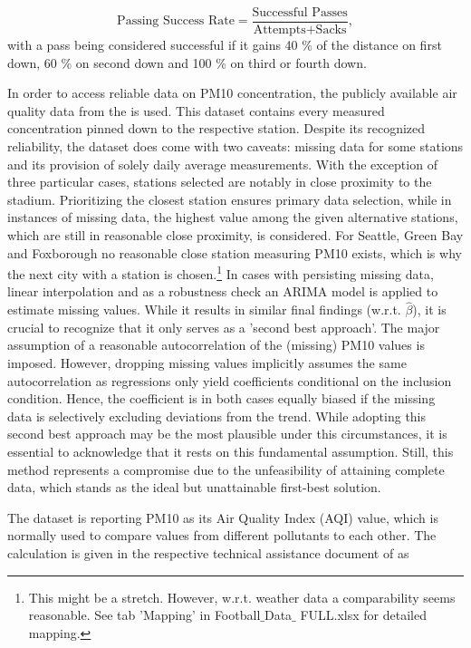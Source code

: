 \documentclass[12pt,a4paper]{article}
\begin{document}
\begin{equation}
\textrm{Passing Success Rate} = \dfrac{\textrm{Successful Passes}}{\textrm{Attempts} + \textrm{Sacks}},
\end{equation}
with a pass being considered successful if it gains 40 \% of the distance on first down, 60 \% on second down and 100 \% on third or fourth down. 

In order to access reliable data on PM10 concentration, the publicly available air quality data from the \citeauthor{EPA} is used. This dataset contains every measured concentration pinned down to the respective station. Despite its recognized reliability, the \citeauthor{EPA} dataset does come with two caveats: missing data for some stations and its provision of solely daily average measurements. With the exception of three particular cases, stations selected are notably in close proximity to the stadium. Prioritizing the closest station ensures primary data selection, while in instances of missing data, the highest value among the given alternative stations, which are still in reasonable close proximity, is considered. For Seattle, Green Bay and Foxborough no reasonable close station measuring PM10 exists, which is why the next city with a station is chosen.\footnote{This might be a stretch. However, w.r.t. weather data a comparability seems reasonable. See tab 'Mapping' in Football$\_$Data$\_$ FULL.xlsx for detailed mapping.}
In cases with persisting missing data, linear interpolation and as a robustness check an ARIMA model is applied to estimate missing values. While it results in similar final findings (w.r.t. $\hat{\beta}$), it is crucial to recognize that it only serves as a 'second best approach'. The major assumption of a reasonable autocorrelation of the (missing) PM10 values is imposed. However, dropping missing values implicitly assumes the same autocorrelation as regressions only yield coefficients conditional on the inclusion condition. Hence, the coefficient is in both cases equally biased if the missing data is selectively excluding deviations from the trend. While adopting this second best approach may be the most plausible under this circumstances, it is essential to acknowledge that it rests on this fundamental assumption. Still, this method represents a compromise due to the unfeasibility of attaining complete data, which stands as the ideal but unattainable first-best solution.

The \citeauthor{EPA} dataset is reporting PM10 as its Air Quality Index (AQI) value, which is normally used to compare values from different pollutants to each other. The calculation is given in the respective technical assistance document of \citeauthor{EPA} as 
\end{document}
